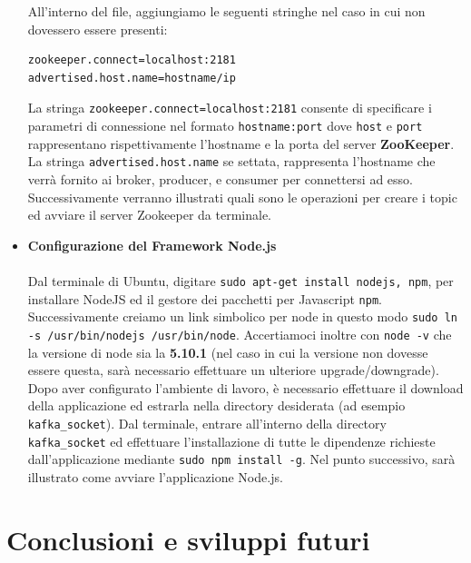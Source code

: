 \documentclass[12pt]{article}
\begin{document}
\begin{itemize}
All'interno del file, aggiungiamo le seguenti stringhe nel caso in cui non dovessero essere presenti: 
\begin{lstlisting}[language=bash,caption=server.properties]
zookeeper.connect=localhost:2181
advertised.host.name=hostname/ip
\end{lstlisting}
La stringa \texttt{zookeeper.connect=localhost:2181} consente di specificare i parametri di connessione nel formato \texttt{hostname:port} dove \texttt{host} e \texttt{port} rappresentano rispettivamente l'hostname e la porta del server \textbf{ZooKeeper}. La stringa \texttt{advertised.host.name} se settata, rappresenta l'hostname che verrà fornito ai broker, producer, e consumer per connettersi ad esso.
Successivamente verranno illustrati quali sono le operazioni per creare i topic ed avviare il server Zookeeper da terminale.

\item {\textbf{Configurazione del Framework Node.js}}\\\\
Dal terminale di Ubuntu, digitare \texttt{sudo apt-get install nodejs, npm}, per installare NodeJS ed il gestore dei pacchetti per Javascript \texttt{npm}. Successivamente creiamo un link simbolico per node in questo modo \texttt{sudo ln -s /usr/bin/nodejs /usr/bin/node}. Accertiamoci inoltre con \texttt{node -v} che la versione di node sia la \textbf{5.10.1} (nel caso in cui la versione non dovesse essere questa, sarà necessario effettuare un ulteriore upgrade/downgrade).
Dopo aver configurato l'ambiente di lavoro, è necessario effettuare il download della applicazione ed estrarla nella directory desiderata (ad esempio \texttt{kafka\_socket}).
Dal terminale, entrare all'interno della directory \texttt{kafka\_socket} ed effettuare l'installazione di tutte le dipendenze richieste dall'applicazione mediante \texttt{sudo npm install -g}.
Nel punto successivo, sarà illustrato come avviare l'applicazione Node.js.


\end{itemize}


\section{Conclusioni e sviluppi futuri}

\clearpage
{}
\nocite{*}



\newpage
\end{document}
